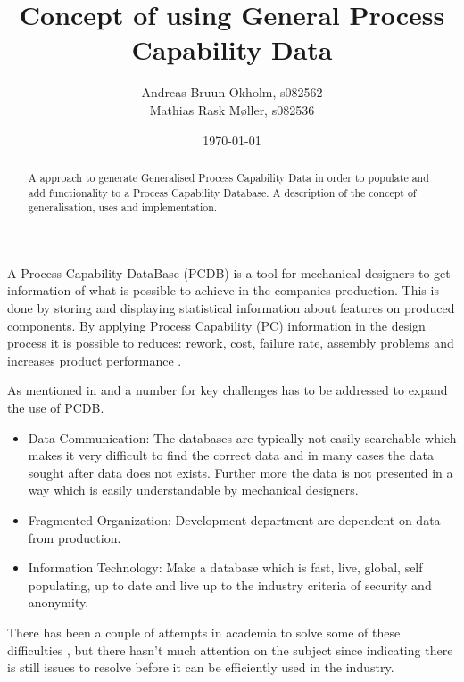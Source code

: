 \documentclass[aip,amsmath, reprint, author-year]{revtex4-1}
\begin{document}
\begin{abstract}
A approach to generate Generalised Process Capability Data in order to populate and add functionality to a Process Capability Database.
A description of the concept of generalisation, uses and implementation.
\end{abstract}

\title{Concept of using General Process Capability Data}
\author{Andreas Bruun Okholm, s082562\\
Mathias Rask Møller, s082536 }
 
\date{\today}
\maketitle


A Process Capability DataBase (PCDB) is a tool for mechanical designers to get information of what is possible to achieve in the companies production. This is done by storing and displaying statistical information about features on produced components.  
By applying Process Capability (PC) information in the design process it is possible to reduces: rework, cost, failure rate, assembly problems and increases product performance \citep{tata1999process}.

As mentioned in \citep{tata1999process, tata1999effective, raskokholm} and a number for key challenges has to be addressed to expand the use of PCDB.
\begin{itemize}
	\item Data Communication: The databases are typically not easily searchable which makes it very difficult to find the correct data and in many cases the data sought after data does not exists. Further more the data is not presented in a way which is easily understandable by mechanical designers.
	\item Fragmented Organization: Development department are dependent on data from production. 
	\item Information Technology: Make a database which is fast, live, global, self populating, up to date and live up to the industry criteria of security and anonymity.
\end{itemize}

There has been a couple of attempts in academia to solve some of these difficulties \citep{thornton2000use, kern2003forecasting, thornton2004variation}, but there hasn't much attention on the subject since indicating there is still issues to resolve before it can be efficiently used in the industry.
\end{document}
